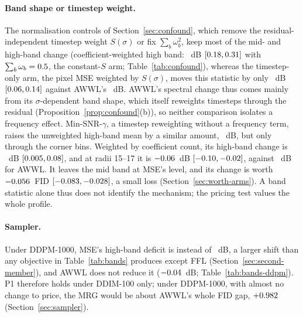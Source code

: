 \paragraph{Band shape or timestep weight.}
The normalisation controls of Section~\ref{sec:confound}, which remove the
residual-independent timestep weight $S(\sigma)$ or fix
$\sum_b \omega_b^2$, keep most of the mid- and high-band change
(coefficient-weighted high band: \corrHighWSumFixed~dB
$[0.18, 0.31]$ with
$\sum_b \omega_b = 0.5$, the constant-$S$ arm;
Table~\ref{tab:confound}), whereas the timestep-only arm, the pixel MSE
weighted by $S(\sigma)$, moves this statistic by only
\corrHighWTimestep~dB $[0.06, 0.14]$ against
AWWL's \corrHighWAWWL~dB. AWWL's spectral change thus comes mainly from its
$\sigma$-dependent band shape, which itself reweights timesteps through the
residual (Proposition~\ref{prop:confound}(b)), so neither comparison
isolates a frequency effect.
Min-SNR-$\gamma$, a timestep reweighting without a frequency term, raises the
unweighted high-band mean by a similar amount, \corrHighMinSNR~dB, but only
through the corner bins. Weighted by coefficient count, its high-band change
is \corrHighWMinSNR~dB $[0.005, 0.08]$, and at
radii 15--17 it is $-0.06$~dB
$[-0.10, -0.02]$, against
\corrInnerHighAWWL~dB for AWWL. It leaves the mid band at MSE's level, and
its change is worth $-0.056$~FID
$[-0.083, -0.028]$, a small loss
(Section~\ref{sec:worth-arms}). A band statistic alone thus does not identify the
mechanism; the pricing test values the whole profile.

\paragraph{Sampler.}
Under DDPM-1000, MSE's high-band deficit is  instead of
~dB, a larger shift than any objective in Table~\ref{tab:bands}
produces except FFL (Section~\ref{sec:second-member}), and AWWL does not
reduce it ($-0.04$~dB; Table~\ref{tab:bands-ddpm}). P1 therefore
holds under DDIM-100 only; under DDPM-1000, with almost no change to
price, the MRG would be about AWWL's whole FID gap, $+0.982$
(Section~\ref{sec:sampler}).
